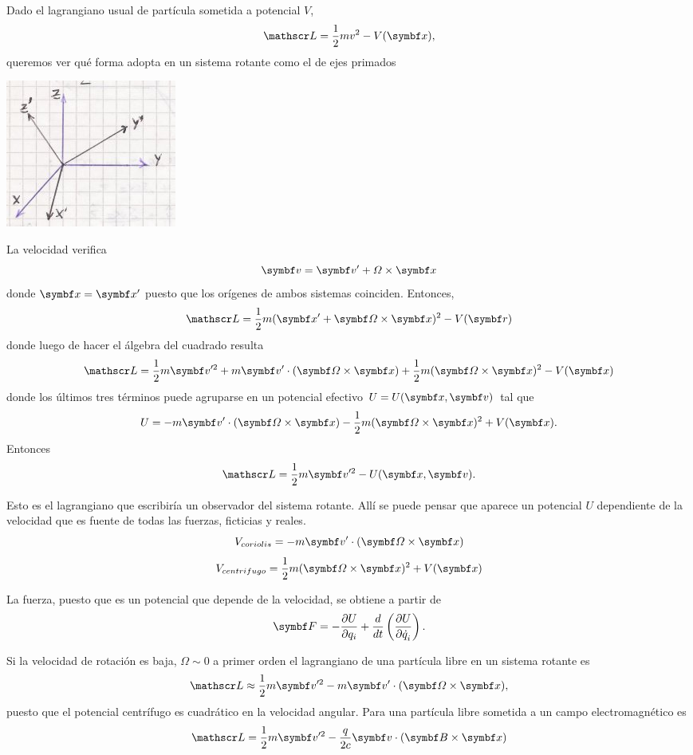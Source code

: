 \documentclass[10pt,oneside]{CBFT_book}
\begin{document}
Dado el lagrangiano usual de partícula sometida a potencial $V$,
\[
	\Lag = \frac{1}{2} m v^2 - V(\vb{x}),
\]
queremos ver qué forma adopta en un sistema rotante como el de ejes primados 

\includegraphics[scale=0.4]{images/fig_mc_rotaciones_ejes_primados.jpg}

La velocidad verifica 
\[
	\vb{v} = \vb{v}' + \Omega \times \vb{x}
\]
donde $ \vb{x} = \vb{x}'$ puesto que los orígenes de ambos sistemas coinciden.
Entonces,
\[
	\Lag = \frac{1}{2} m ( \vb{x}' + \vb{\Omega} \times \vb{x} )^2 - V(\vb{r})
\]
donde luego de hacer el álgebra del cuadrado resulta 
\[
	\Lag = \frac{1}{2} m \vb{v}'^2 + m \vb{v}' \cdot ( \vb{\Omega} \times \vb{x} ) + 
		\frac{1}{2} m ( \vb{\Omega} \times \vb{x} )^2 - V(\vb{x})
\]
donde los últimos tres términos puede agruparse en un potencial efectivo $ U = U(\vb{x}, \vb{v})$
tal que 
\[
	U = - m \vb{v}' \cdot ( \vb{\Omega} \times \vb{x} ) - 
		\frac{1}{2} m ( \vb{\Omega} \times \vb{x} )^2 + V(\vb{x}).
\]
Entonces 
\[
	\Lag = \frac{1}{2} m \vb{v}'^2 - U(\vb{x},\vb{v}).
\]

Esto es el lagrangiano que escribiría un observador del sistema rotante.
Allí se puede pensar que aparece un potencial $U$ dependiente de la velocidad que es fuente de todas
las fuerzas, ficticias y reales.
\[
	V_{coriolis} = - m \vb{v}' \cdot ( \vb{\Omega} \times \vb{x} )  
\]
\[
	V_{centrifugo} = \frac{1}{2} m ( \vb{\Omega} \times \vb{x} )^2 + V(\vb{x})
\]

La fuerza, puesto que es un potencial que depende de la velocidad, se obtiene a partir de  
\[
	\vb{F} = -\dpar{U}{q_i} + \frac{d}{dt} \left( \dpar{U}{\dot{q}_i} \right).
\]

Si la velocidad de rotación es baja, $\Omega \sim 0 $ a primer orden el lagrangiano de una partícula
libre en un sistema rotante es 
\[
	\Lag \approx \frac{1}{2} m \vb{v}'^2 - m \vb{v}' \cdot ( \vb{\Omega} \times \vb{x} ) ,
\]
puesto que el potencial centrífugo es cuadrático en la velocidad angular.
Para una partícula libre sometida a un campo electromagnético es
\[
	\Lag = \frac{1}{2} m \vb{v}'^2 - \frac{q}{2c} \vb{v} \cdot ( \vb{B} \times \vb{x} )
\]
\end{document}
